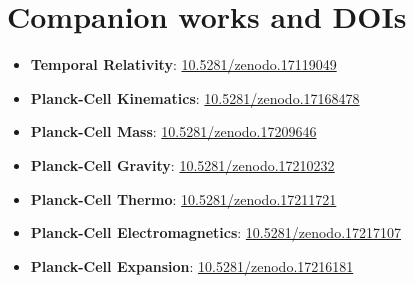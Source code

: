 \section*{Companion works and DOIs}
\label{sec:zenodo-links}
\begin{itemize}
  \item \textbf{Temporal Relativity}: \href{https://doi.org/10.5281/zenodo.17119049}{10.5281/zenodo.17119049}
  \item \textbf{Planck-Cell Kinematics}: \href{https://doi.org/10.5281/zenodo.17168478}{10.5281/zenodo.17168478}
  \item \textbf{Planck-Cell Mass}: \href{https://doi.org/10.5281/zenodo.17209646}{10.5281/zenodo.17209646}
  \item \textbf{Planck-Cell Gravity}: \href{https://doi.org/10.5281/zenodo.17210232}{10.5281/zenodo.17210232}
  \item \textbf{Planck-Cell Thermo}: \href{https://doi.org/10.5281/zenodo.17211721}{10.5281/zenodo.17211721}
  \item \textbf{Planck-Cell Electromagnetics}: \href{https://doi.org/10.5281/zenodo.17217107}{10.5281/zenodo.17217107}
  \item \textbf{Planck-Cell Expansion}: \href{https://doi.org/10.5281/zenodo.17216181}{10.5281/zenodo.17216181}
\end{itemize}
